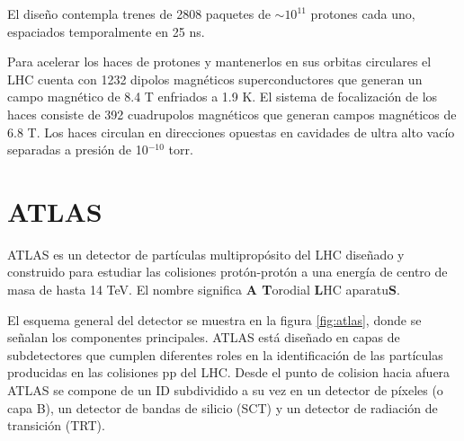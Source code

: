 El diseño contempla trenes de 2808 paquetes de $\sim 10^{11}$ protones cada uno,
espaciados temporalmente en 25 ns.

Para acelerar los haces de protones y mantenerlos en sus orbitas circulares el
LHC cuenta con 1232 dipolos magnéticos superconductores que generan un campo
magnético de 8.4 T enfriados a 1.9 K. El sistema de focalización de los haces
consiste de 392 cuadrupolos magnéticos que generan campos magnéticos de 6.8 T.
Los haces circulan en direcciones opuestas en cavidades de ultra alto vacío
separadas a presión de 10$^{-10}$ torr.


\section{ATLAS}

ATLAS es un detector de partículas multipropósito del LHC diseñado y construido
para estudiar las colisiones protón-protón a una energía de centro de masa de
hasta 14 TeV. El nombre significa \textbf{A T}orodial \textbf{L}HC
aparatu\textbf{S}.




El esquema general del detector se muestra en la figura \ref{fig:atlas}, donde
se señalan los componentes principales. ATLAS está diseñado en capas de
subdetectores que cumplen diferentes roles en la identificación de las
partículas producidas en las colisiones pp del LHC. Desde el punto de colision
hacia afuera ATLAS se compone de un ID subdividido a su vez en un detector de
píxeles (o capa B), un detector de bandas de silicio (SCT) y un detector de
radiación de transición (TRT).

